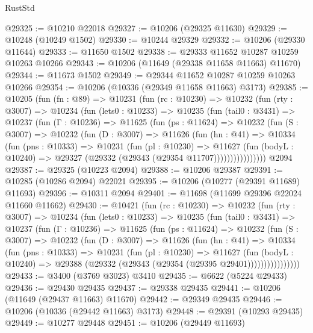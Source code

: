 \begin{lexlean}{RustStd}
\begin{coremodule}
@29325 := @10210 @22018
@29327 := @10206 (@29325 @11630)
@29329 := @10248 (@10249 @1502)
@29330 := @10244 @29329
@29332 := @10206 (@29330 @11644)
@29333 := @11650 @1502
@29338 := @29333 @11652 @10287 @10259 @10263 @10266
@29343 := @10206 (@11649 (@29338 @11658 @11663) @11670)
@29344 := @11673 @1502
@29349 := @29344 @11652 @10287 @10259 @10263 @10266
@29354 := @10206 (@10336 (@29349 @11658 @11663) @3173)
@29385 := @10205
    (fun (fn : @89) =>
    @10231
      (fun (rc : @10230) =>
      @10232
        (fun (rty : @3007) =>
        @10234
          (fun (lets0 : @10233) =>
          @10235
            (fun (tail0 : @3431) =>
            @10237
              (fun (Γ : @10236) =>
              @11625
                (fun (ps : @11624) =>
                @10232
                  (fun (S : @3007) =>
                  @10232
                    (fun (D : @3007) =>
                    @11626
                      (fun (hn : @41) =>
                      @10334
                        (fun (pns : @10333) =>
                        @10231
                          (fun (pl : @10230) =>
                          @11627
                            (fun (bodyL : @10240) =>
                            @29327 (@29332 (@29343 (@29354 @11707))))))))))))))))
    @2094
@29387 := @29325 (@10223 @2094)
@29388 := @10206 @29387
@29391 := @10285 (@10286 @2094) @22021
@29395 := @10206 (@10277 (@29391 @11689) @11693)
@29396 := @10311 @2094
@29401 := @11698 (@11699 @29396 @22024 @11660 @11662)
@29430 := @10421
    (fun (rc : @10230) =>
    @10232
      (fun (rty : @3007) =>
      @10234
        (fun (lets0 : @10233) =>
        @10235
          (fun (tail0 : @3431) =>
          @10237
            (fun (Γ : @10236) =>
            @11625
              (fun (ps : @11624) =>
              @10232
                (fun (S : @3007) =>
                @10232
                  (fun (D : @3007) =>
                  @11626
                    (fun (hn : @41) =>
                    @10334
                      (fun (pns : @10333) =>
                      @10231
                        (fun (pl : @10230) =>
                        @11627
                          (fun (bodyL : @10240) =>
                          @29388 (@29332 (@29343 (@29354 (@29395 @29401))))))))))))))))
@29433 := @3400 (@3769 @3023) @3410
@29435 := @6622 (@5224 @29433)
@29436 := @29430 @29435
@29437 := @29338 @29435
@29441 := @10206 (@11649 (@29437 @11663) @11670)
@29442 := @29349 @29435
@29446 := @10206 (@10336 (@29442 @11663) @3173)
@29448 := @29391 (@10293 @29435)
@29449 := @10277 @29448
@29451 := @10206 (@29449 @11693)

\end{coremodule}
\end{lexlean}
